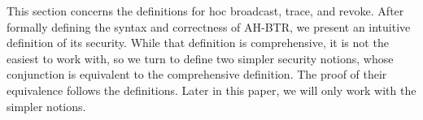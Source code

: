 This section concerns the definitions for \ad hoc broadcast, trace, and revoke.
After formally defining the syntax and correctness of AH-BTR,
we present an intuitive definition of its security.
While that definition is comprehensive,
it is not the easiest to work with, so
we turn to define two simpler security notions, whose conjunction is equivalent to the comprehensive definition.
The proof of their equivalence follows the definitions.
Later in this paper, we will only work with the simpler notions.
